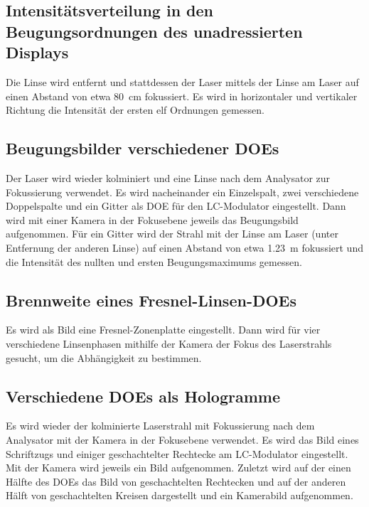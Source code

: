 \documentclass[
	a4paper,
	12pt,
	pagesize,
	ngerman
]{scrartcl}
\begin{document}
	\subsection{Intensitätsverteilung in den Beugungsordnungen des unadressierten Displays} %
	Die Linse wird entfernt und stattdessen der Laser mittels der Linse am Laser auf einen Abstand von etwa \SI{80}{\centi \meter} fokussiert. %
	Es wird in horizontaler und vertikaler Richtung die Intensität der ersten elf Ordnungen gemessen. %

	\subsection{Beugungsbilder verschiedener DOEs}
		Der Laser wird wieder kolminiert und eine Linse nach dem Analysator zur Fokussierung verwendet.
		Es wird nacheinander ein Einzelspalt, zwei verschiedene Doppelspalte und ein Gitter als DOE für den LC-Modulator eingestellt.
		Dann wird mit einer Kamera in der Fokusebene jeweils das Beugungsbild aufgenommen.
		Für ein Gitter wird der Strahl mit der Linse am Laser (unter Entfernung der anderen Linse) auf einen Abstand von etwa \SI{1,23}{m} fokussiert und die Intensität des nullten und ersten Beugungsmaximums gemessen.

	\subsection{Brennweite eines Fresnel-Linsen-DOEs}
		Es wird als Bild eine Fresnel-Zonenplatte eingestellt.
		Dann wird für vier verschiedene Linsenphasen mithilfe der Kamera der Fokus des Laserstrahls gesucht, um die Abhängigkeit zu bestimmen.

	\subsection{Verschiedene DOEs als Hologramme}
		Es wird wieder der kolminierte Laserstrahl mit Fokussierung nach dem Analysator mit der Kamera in der Fokusebene verwendet.
		Es wird das Bild eines Schriftzugs und einiger geschachtelter Rechtecke am LC-Modulator eingestellt. %
		Mit der Kamera wird jeweils ein Bild aufgenommen.
		Zuletzt wird auf der einen Hälfte des DOEs das Bild von geschachtelten Rechtecken und auf der anderen Hälft von geschachtelten Kreisen dargestellt und ein Kamerabild aufgenommen.
\end{document}
